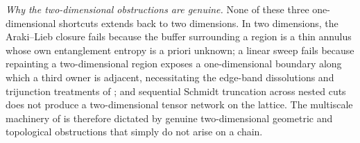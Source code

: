 \begin{inwords}
\emph{Why the two-dimensional obstructions are genuine.} None of these three
one-dimensional shortcuts extends back to two dimensions. In two dimensions,
the Araki--Lieb closure fails because the buffer surrounding a region is a
thin annulus whose own entanglement entropy is a priori unknown; a linear
sweep fails because repainting a two-dimensional region exposes a
one-dimensional boundary along which a third owner is adjacent, necessitating
the edge-band dissolutions and trijunction treatments of \cite{PP}; and sequential
Schmidt truncation across nested cuts does not produce a two-dimensional
tensor network on the lattice. The multiscale machinery of
\cite{AL,PP} is therefore dictated by genuine two-dimensional geometric and
topological obstructions that simply do not arise on a chain.
\end{inwords}
